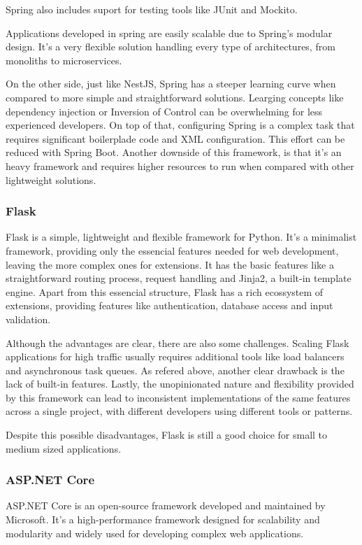 Spring also includes suport for testing tools like JUnit and Mockito.

Applications developed in spring are easily scalable due to Spring's modular
design.
It's a very flexible solution handling every type of architectures, from
monoliths to microservices.

On the other side, just like NestJS, Spring has a steeper learning curve when
compared to more simple and straightforward solutions. Learging concepts like
dependency injection or Inversion of Control can be overwhelming for less
experienced developers.
On top of that, configuring Spring is a complex task that requires significant
boilerplade code and \gls{XML} configuration. This effort can be reduced with Spring
Boot.
Another downside of this framework, is that it's an heavy framework and
requires higher resources to run when compared with other lightweight solutions.

\subsubsection{Flask}
Flask is a simple, lightweight and flexible framework for Python. It's a
minimalist framework, providing only the essencial features needed for
web development, leaving the more complex ones for extensions. It has the basic
features like a straightforward routing process, request handling and Jinja2,
a built-in template engine. Apart from this essencial structure, Flask has a
rich ecossystem of extensions, providing features like authentication,
database access and input validation.

Although the advantages are clear, there are also some challenges. Scaling
Flask applications for high traffic usually requires additional tools like load
balancers and asynchronous task queues. As refered above, another clear
drawback is the lack of built-in features. Lastly, the unopinionated nature and
flexibility provided by this framework can lead to inconsistent implementations
of the same features across a single project, with different developers using
different tools or patterns.

Despite this possible disadvantages, Flask is still a good choice for small to
medium sized applications.

\subsubsection{ASP.NET Core}
ASP.NET Core is an open-source framework developed and maintained by Microsoft.
It's a high-performance framework designed for scalability and modularity and
widely used for developing complex web applications.

